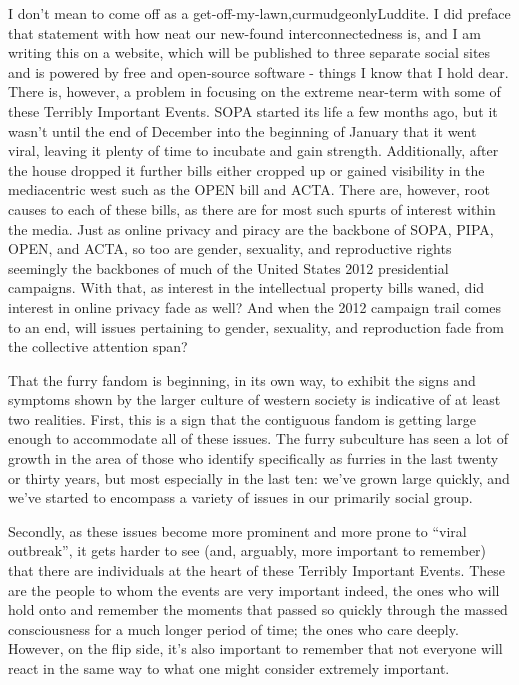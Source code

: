 I don't mean to come off as a get-off-my-lawn,curmudgeonlyLuddite. I did preface that statement with how neat our new-found interconnectedness is, and I am writing this on a website, which will be published to three separate social sites and is powered by free and open-source software - things I know that I hold dear. There is, however, a problem in focusing on the extreme near-term with some of these Terribly Important Events. SOPA started its life a few months ago, but it wasn't until the end of December into the beginning of January that it went viral, leaving it plenty of time to incubate and gain strength. Additionally, after the house dropped it further bills either cropped up or gained visibility in the mediacentric west such as the OPEN bill and ACTA. There are, however, root causes to each of these bills, as there are for most such spurts of interest within the media. Just as online privacy and piracy are the backbone of SOPA, PIPA, OPEN, and ACTA, so too are gender, sexuality, and reproductive rights seemingly the backbones of much of the United States 2012 presidential campaigns. With that, as interest in the intellectual property bills waned, did interest in online privacy fade as well? And when the 2012 campaign trail comes to an end, will issues pertaining to gender, sexuality, and reproduction fade from the collective attention span?

That the furry fandom is beginning, in its own way, to exhibit the signs and symptoms shown by the larger culture of western society is indicative of at least two realities. First, this is a sign that the contiguous fandom is getting large enough to accommodate all of these issues. The furry subculture has seen a lot of growth in the area of those who identify specifically as furries in the last twenty or thirty years, but most especially in the last ten: we've grown large quickly, and we've started to encompass a variety of issues in our primarily social group.

Secondly, as these issues become more prominent and more prone to ``viral outbreak'', it gets harder to see (and, arguably, more important to remember) that there are individuals at the heart of these Terribly Important Events. These are the people to whom the events are very important indeed, the ones who will hold onto and remember the moments that passed so quickly through the massed consciousness for a much longer period of time; the ones who care deeply. However, on the flip side, it's also important to remember that not everyone will react in the same way to what one might consider extremely important.

